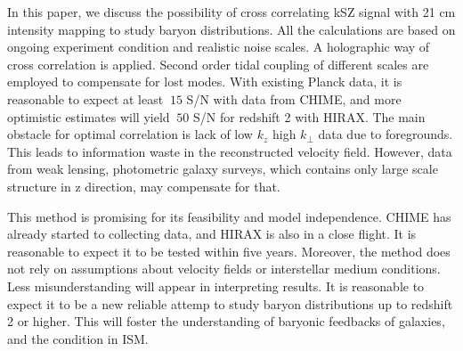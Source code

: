 In this paper, we discuss the possibility of cross correlating kSZ signal with 
21 cm intensity mapping to study baryon distributions. 
All the calculations are based on ongoing experiment condition and realistic noise scales. 
A holographic way of cross correlation is applied. 
Second order tidal coupling of different scales are employed to compensate for 
lost modes. 
With existing Planck data, 
it is reasonable to expect at least $~15$ S/N with data from CHIME, 
and more optimistic estimates will yield $~50$ S/N for redshift 2 with HIRAX. 
The main obstacle for optimal correlation 
is lack of low $k_z$ high $k_\perp$ data due to foregrounds. 
This leads to information waste in the reconstructed velocity field. 
However, data from weak lensing, photometric galaxy surveys, which 
contains only large scale structure in z direction, may 
compensate for that. 
 
This method is promising for its feasibility and model independence. 
CHIME has already started to collecting data, 
and HIRAX is also in a close flight. 
It is reasonable to expect it to be tested within five years. 
Moreover, the method does not rely on assumptions about velocity fields 
or interstellar medium conditions. 
Less misunderstanding will appear in interpreting results. 
It is reasonable to expect it to be a new 
reliable attemp to study baryon distributions up to 
redshift 2 or higher. 
This will foster the understanding of baryonic feedbacks of galaxies, 
and the condition in ISM.
